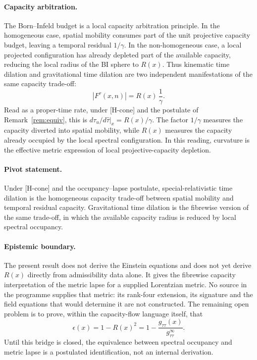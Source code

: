 \documentclass[11pt,a4paper]{article}
\begin{document}
    \paragraph{Capacity arbitration.}
      The Born--Infeld budget is a local capacity arbitration principle.
      In the homogeneous case, spatial mobility consumes part of the unit projective capacity
      budget, leaving a temporal residual $1/\gamma$.
      In the non-homogeneous case, a local projected configuration has already depleted part
      of the available capacity, reducing the local radius of the BI sphere to $R(x)$.
      Thus kinematic time dilation and gravitational time dilation are two independent
      manifestations of the same capacity trade-off:
      \begin{equation}\label{eq:unification}
        |F^\tau(x,n)| = R(x)\,\frac{1}{\gamma}.
      \end{equation}
      Read as a proper-time rate, under [H-cone] and the postulate of Remark~\ref{rem:equiv}, this is
      $d\tau_u/d\hat\tau|_x = R(x)/\gamma$.
      The factor $1/\gamma$ measures the capacity diverted into spatial mobility, while
      $R(x)$ measures the capacity already occupied by the local spectral configuration.
      In this reading, curvature is the effective metric expression of local
      projective-capacity depletion.

    \paragraph{Pivot statement.}
      Under [H-cone] and the occupancy--lapse postulate, special-relativistic time dilation is the homogeneous
      capacity trade-off between spatial
      mobility and temporal residual capacity.
      Gravitational time dilation is the fibrewise version of the same trade-off, in which the
      available capacity radius is reduced by local spectral occupancy.

    \paragraph{Epistemic boundary.}
      The present result does not derive the Einstein equations and does not yet derive
      $R(x)$ directly from admissibility data alone.
      It gives the fibrewise capacity interpretation of the metric lapse for a supplied Lorentzian metric.
      No source in the programme supplies that metric: its rank-four extension, its signature and the field
      equations that would determine it are not constructed.
      The remaining open problem is to prove, within the capacity-flow language itself, that
      \[
        \epsilon(x) = 1-R(x)^2 = 1-\frac{g_{\tau\tau}(x)}{g_{\tau\tau}^\infty}.
      \]
      Until this bridge is closed, the equivalence between spectral occupancy and metric lapse
      is a postulated identification, not an internal derivation.
\end{document}
